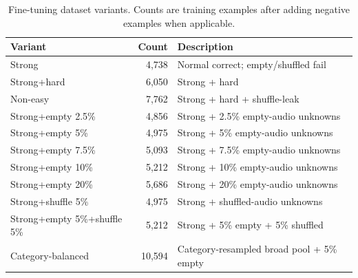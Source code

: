 \begin{table}[t]
\centering
\small
\caption{Fine-tuning dataset variants. Counts are training examples after adding negative examples when applicable.}
\label{tab:data_variants}
\begin{tabular}{l|rl}
\toprule
Variant & Count & Description \\
\midrule
Strong & 4,738 & Normal correct; empty/shuffled fail \\
Strong+hard & 6,050 & Strong + hard \\
Non-easy & 7,762 & Strong + hard + shuffle-leak \\
Strong+empty 2.5\% & 4,856 & Strong + 2.5\% empty-audio unknowns \\
Strong+empty 5\% & 4,975 & Strong + 5\% empty-audio unknowns \\
Strong+empty 7.5\% & 5,093 & Strong + 7.5\% empty-audio unknowns \\
Strong+empty 10\% & 5,212 & Strong + 10\% empty-audio unknowns \\
Strong+empty 20\% & 5,686 & Strong + 20\% empty-audio unknowns \\
Strong+shuffle 5\% & 4,975 & Strong + shuffled-audio unknowns \\
Strong+empty 5\%+shuffle 5\% & 5,212 & Strong + 5\% empty + 5\% shuffled \\
Category-balanced & 10,594 & Category-resampled broad pool + 5\% empty \\
\bottomrule
\end{tabular}
\vspace{-15pt}
\end{table}
